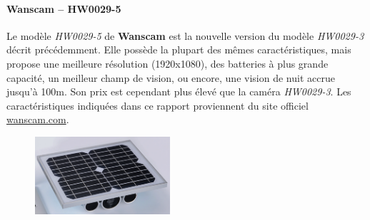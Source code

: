 \paragraph{\textbf{Wanscam} -- HW0029-5}
Le modèle \textit{HW0029-5} de \textbf{Wanscam} est la nouvelle version du modèle \textit{HW0029-3} décrit précédemment. Elle possède la plupart des mêmes caractéristiques, mais propose une meilleure résolution (1920x1080), des batteries à plus grande capacité, un meilleur champ de vision, ou encore, une vision de nuit accrue jusqu'à 100m. Son prix est cependant plus élevé que la caméra \textit{HW0029-3}. Les caractéristiques indiquées dans ce rapport proviennent du site officiel \url{wanscam.com}\autocite{cam:wan5}.

\begin{figure}[ht]
    \includegraphics[width=50mm]{img/conception/wan5_cam.png}
    \centering
\end{figure}

